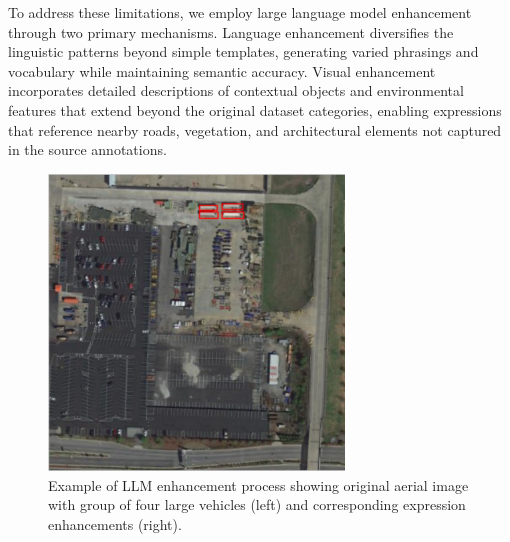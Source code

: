 To address these limitations, we employ large language model enhancement through two primary mechanisms. Language enhancement diversifies the linguistic patterns beyond simple templates, generating varied phrasings and vocabulary while maintaining semantic accuracy. Visual enhancement incorporates detailed descriptions of contextual objects and environmental features that extend beyond the original dataset categories, enabling expressions that reference nearby roads, vegetation, and architectural elements not captured in the source annotations.

\begin{figure}[H]
\centering
\begin{minipage}{0.5\textwidth}
\centering
\includegraphics[width=0.7\textwidth]{./images/example_group.png}
\end{minipage}%
\begin{minipage}{0.5\textwidth}
\centering
\hspace{-1cm}
\end{minipage}
\caption{Example of LLM enhancement process showing original aerial image with group of four large vehicles (left) and corresponding expression enhancements (right).}
\label{fig:llm_enhancement_example}
\end{figure}


